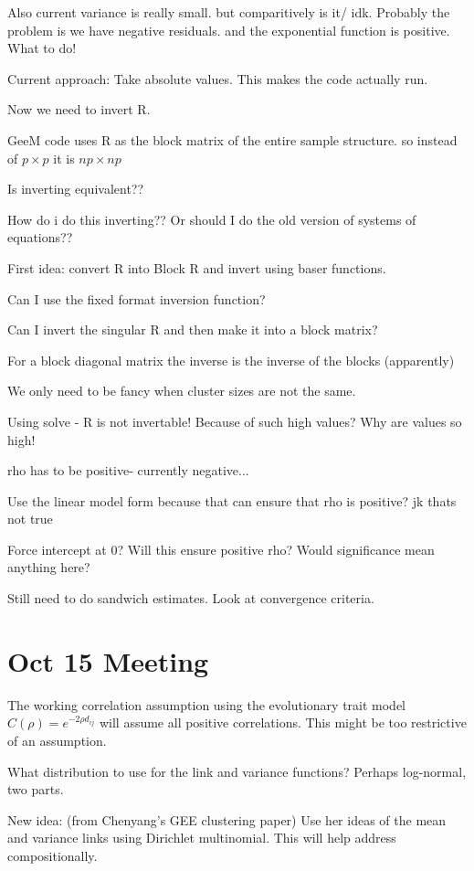 \documentclass[10pt]{article}
\begin{document}
Also current variance is really small. but comparitively is it/ idk.
Probably the problem is we have negative residuals. and the exponential function is positive. What to do!

Current approach: Take absolute values. This makes the code actually run.

Now we need to invert R.

GeeM code uses R as the block matrix of the entire sample structure. so instead of $p \times p$ it is $np \times np$

Is inverting equivalent??

How do i do this inverting??
Or should I do the old version of systems of equations??

First idea: convert R into Block R and invert using baser functions.

Can I use the fixed format inversion function?

Can I invert the singular R and then make it into a block matrix?

For a block diagonal matrix the inverse is the inverse of the blocks (apparently)

We only need to be fancy when cluster sizes are not the same.


Using solve - R is not invertable! Because of such high values?
Why are values so high!

rho has to be positive- currently negative...

Use the linear model form because that can ensure that rho is positive? jk thats not true

Force intercept at 0? Will this ensure positive rho?
Would significance mean anything here?


Still need to do sandwich estimates.
Look at convergence criteria.


\section{Oct 15 Meeting}

The working correlation assumption using the evolutionary trait model $C(\rho) = e^{-2\rho d_{ij}}$ will assume all positive correlations. This might be too restrictive of an assumption.

What distribution to use for the link and variance functions? Perhaps log-normal, two parts.

New idea: (from Chenyang's GEE clustering paper) Use her ideas of the mean and variance links using Dirichlet multinomial. This will help address compositionally.
\end{document}

